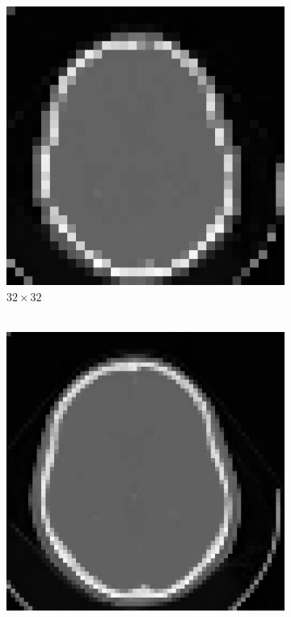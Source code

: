 \documentclass[11pt,twocolumn,twoside]{opticajnl}
\begin{document}
\begin{figure}[h]
\begin{subfigure}[h]{0.24\linewidth}
        \end{subfigure}
         \begin{subfigure}[h]{0.24\linewidth}
            \centering
            \includegraphics[width=\textwidth]{Figuras/Interpolate_bilinear_f=0.25.png}
            \caption{$32\times32$ \\
            $~$} 
         \end{subfigure}
         \begin{subfigure}[h]{0.24\linewidth}
            \centering
            \includegraphics[width=\textwidth]{Figuras/Interpolate_bilinear_f=0.5.png}

\end{subfigure}
\end{figure}
\end{document}
